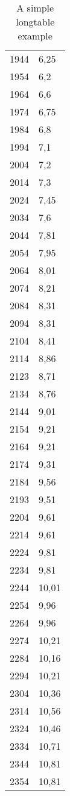 \begin{table}
\begin{tabular}{rl}
1944	&	6,25\\
1954	&	6,2\\
1964	&	6,6\\
1974	&	6,75\\
1984	&	6,8\\
1994	&	7,1\\
2004	&	7,2\\
2014	&	7,3\\
2024	&	7,45\\
2034	&	7,6\\
2044	&	7,81\\
2054	&	7,95\\
2064	&	8,01\\
2074	&	8,21\\
2084	&	8,31\\
2094	&	8,31\\
2104	&	8,41\\
2114	&	8,86\\
2123	&	8,71\\
2134	&	8,76\\
2144	&	9,01\\
2154	&	9,21\\
2164	&	9,21\\
2174	&	9,31\\
2184	&	9,56\\
2193	&	9,51\\
2204	&	9,61\\
2214	&	9,61\\
2224	&	9,81\\
2234	&	9,81\\
2244	&	10,01\\
2254	&	9,96\\
2264	&	9,96\\
2274	&	10,21\\
2284	&	10,16\\
2294	&	10,21\\
2304	&	10,36\\
2314	&	10,56\\
2324	&	10,46\\
2334	&	10,71\\
2344	&	10,81\\
2354	&	10,81
\end{tabular}
\caption{A simple longtable example}
\end{table}